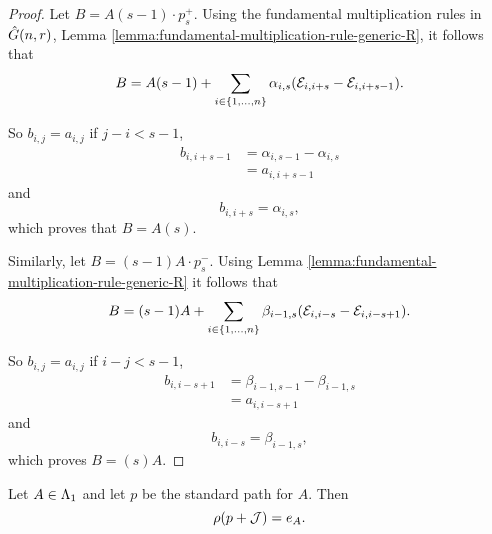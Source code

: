 \documentclass[a4paper, 11pt]{report}
\begin{document}
\begin{proof}
Let $B=A(s-1)\cdot p_s^+$. Using the fundamental multiplication rules in $\hat{G}(n,r)$, Lemma \ref{lemma:fundamental-multiplication-rule-generic-R}, it follows that
\begin{equation*}
B = A(s-1) + \sum_{i\in\{1,\ldots,n\}} \alpha_{i,s}(\mathcal{E}_{i,i+s} -\mathcal{E}_{i,i+s-1}).
\end{equation*}

So $b_{i,j}=a_{i,j}$ if $j-i<s-1$,
\begin{align*}
b_{i,i+s-1}
&= \alpha_{i,s-1}-\alpha_{i,s}\\
&= a_{i,i+s-1}
\end{align*}
and
\begin{equation*}
b_{i,i+s} = \alpha_{i,s},
\end{equation*}
which proves that $B=A(s)$.

Similarly, let $B=(s-1)A\cdot p_s^-$. Using Lemma \ref{lemma:fundamental-multiplication-rule-generic-R} it follows that
\begin{equation*}
B = (s-1)A + \sum_{i\in\{1,\ldots,n\}} \beta_{i-1,s}(\mathcal{E}_{i,i-s} - \mathcal{E}_{i,i-s+1}).
\end{equation*}

So $b_{i,j}=a_{i,j}$ if $i-j<s-1$,
\begin{align*}
b_{i,i-s+1}
&= \beta_{i-1,s-1} - \beta_{i-1,s}\\
&= a_{i,i-s+1}
\end{align*}
and
\begin{equation*}
b_{i,i-s} = \beta_{i-1,s},
\end{equation*}
which proves $B=(s)A$.
\end{proof}

\begin{lemma}\label{lemma:image-of-standard-path-generic}
Let $A\in\Lambda_1{}$ and let $p$ be the standard path for $A$. Then
\begin{equation*}
\rho(p+\mathcal{J}) = e_A.
\end{equation*}
\end{lemma}
\end{document}
